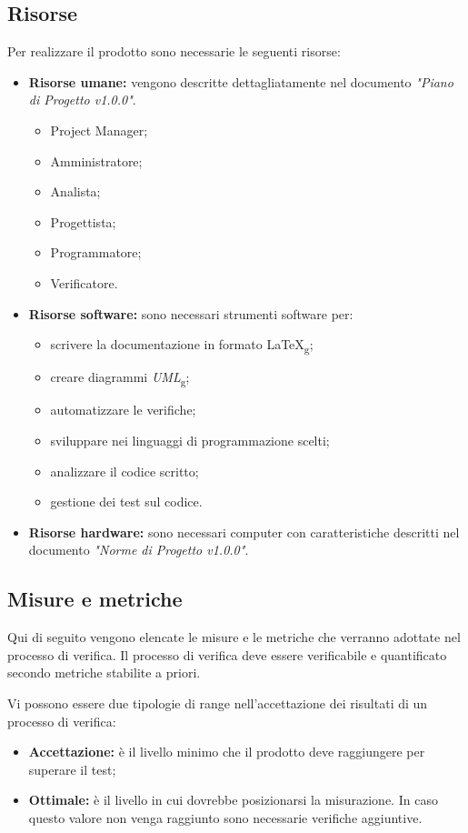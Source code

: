 \documentclass[12pt,a4paper,titlepage]{article}
\begin{document}
	\subsection{Risorse}
	Per realizzare il prodotto sono necessarie le seguenti risorse:
	\begin{itemize}
		\item \textbf{Risorse umane:} vengono descritte dettagliatamente nel documento \textit{"Piano di Progetto v1.0.0"}.
		\begin{itemize}
			\item Project Manager;
			\item Amministratore;
			\item Analista;
			\item Progettista;
			\item Programmatore;
			\item Verificatore.
		\end{itemize}
		\item \textbf{Risorse software:} sono necessari strumenti software per:
		\begin{itemize}
			\item scrivere la documentazione in formato \LaTeX\textsubscript{g};
			\item creare diagrammi \textit{UML}\textsubscript{g};
			\item automatizzare le verifiche;
			\item sviluppare nei linguaggi di programmazione scelti;
			\item analizzare il codice scritto;
			\item gestione dei test sul codice.
		\end{itemize}
		\item \textbf{Risorse hardware:} sono necessari computer con caratteristiche descritti nel documento \textit{"Norme di Progetto v1.0.0"}. 
	\end{itemize}
	\subsection{Misure e metriche}
	Qui di seguito vengono elencate le misure e le metriche che verranno adottate nel processo di verifica. Il processo di verifica deve essere verificabile e quantificato secondo metriche stabilite a priori.
	
	Vi possono essere due tipologie di range nell'accettazione dei risultati di un processo di verifica:
	\begin{itemize}
		\item \textbf{Accettazione:} è il livello minimo che il prodotto deve raggiungere per superare il test;
		\item \textbf{Ottimale:} è il livello in cui dovrebbe posizionarsi la misurazione. In caso questo valore non venga raggiunto sono necessarie verifiche aggiuntive.
	\end{itemize}
\end{document}
